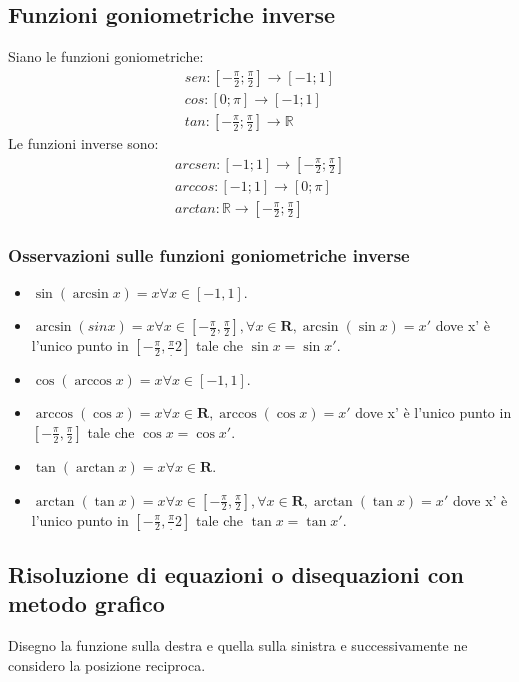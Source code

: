 \subsection{Funzioni goniometriche inverse}
Siano le funzioni goniometriche:
\begin{equation}
\begin{gathered}
sen: [-\frac{\pi}{2};\frac{\pi}{2}] \rightarrow [-1;1]\\
cos: [0;\pi] \rightarrow [-1;1]\\
tan: [-\frac{\pi}{2};\frac{\pi}{2}] \rightarrow \mathbb{R}
\end{gathered}
\end{equation}
Le funzioni inverse sono:
\begin{equation}
\begin{gathered}
arcsen: [-1;1] \rightarrow [-\frac{\pi}{2};\frac{\pi}{2}]\\
arccos: [-1;1] \rightarrow [0;\pi]\\
arctan: \mathbb{R} \rightarrow [-\frac{\pi}{2};\frac{\pi}{2}]
\end{gathered}
\end{equation}
\subsubsection{Osservazioni sulle funzioni goniometriche inverse}
\begin{itemize}
\item $\sin(\arcsin x)=x \forall x\in [-1,1]$.
\item $\arcsin(sinx)=x \forall x\in [-\frac{\pi}{2}, \frac{\pi}{2}], \forall x\in\mathbf{R}, \arcsin(\sin x)=x'$ dove x' \`e l'unico punto in $[-\frac{\pi}{2}, \frac{\pi}.
{2}]$ tale che $\sin x=\sin x'$.
\item $\cos(\arccos x)=x \forall x\in[-1,1].$
\item $\arccos(\cos x)=x \forall x\in\mathbf{R}, \arccos(\cos x)=x'$ dove x' \`e l'unico punto in $[-\frac{\pi}{2}, \frac{\pi}{2}]$ tale che $\cos x=\cos x'$.
\item $\tan(\arctan x)=x \forall x\in \mathbf{R}$.
\item$\arctan(\tan x)=x \forall x\in [-\frac{\pi}{2}, \frac{\pi}{2}], \forall x\in\mathbf{R}, \arctan(\tan x)=x'$ dove x' \`e l'unico punto in $[-\frac{\pi}{2}, \frac{\pi}.
{2}]$ tale che $\tan x=\tan x'$.
\end{itemize}
\subsection{Risoluzione di equazioni o disequazioni con metodo grafico}
Disegno la funzione sulla destra e quella sulla sinistra e successivamente ne considero la posizione reciproca. 